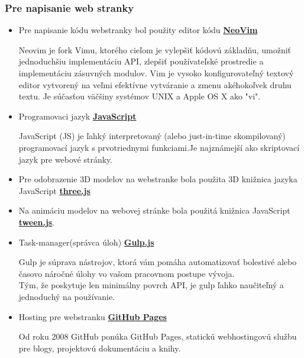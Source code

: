       \subsubsection{Pre napisanie web stranky}
        \begin{itemize}
          \item{
            Pre napisanie kódu webstranky bol použity editor kódu \textbf{\href{https://neovim.io/}{NeoVim}}

            Neovim je fork Vimu, ktorého cieľom je vylepšiť kódovú základňu, umožniť jednoduchšiu implementáciu API, zlepšiť používateľské prostredie a implementáciu zásuvných modulov.
            Vim je vysoko konfigurovateľný textový editor vytvorený na veľmi efektívne vytváranie a zmenu akéhokoľvek druhu textu. Je súčasťou väčšiny systémov UNIX a Apple OS X ako "vi".
          }
          \item{
            Programovaci jazyk \textbf{\href{https://developer.mozilla.org/en-US/docs/Web/JavaScript}{JavaScript}}

            JavaScript (JS) je ľahký interpretovaný (alebo just-in-time skompilovaný) programovací jazyk s prvotriednymi funkciami.Je najznámejší ako skriptovací jazyk pre webové stránky.
          }
          \item{
            Pre odobrazenie 3D modelov na webstranke bola použita 3D knižnica jazyka JavaScript \textbf{\href{https://github.com/mrdoob/three.js/}{three.js}}
          }
          \item{
            Na animáciu modelov na webovej stránke bola použitá knižnica JavaScript \textbf{\href{https://tweenjs.github.io/tween.js/}{tween.js}}.
          }
          \item{
            Task-manager(správca úloh) \textbf{\href{https://gulpjs.com}{Gulp.js}}

            Gulp je súprava nástrojov, ktorá vám pomáha automatizovať bolestivé alebo časovo náročné úlohy vo vašom pracovnom postupe vývoja. \\
            Tým, že poskytuje len minimálny povrch API, je gulp ľahko naučiteľný a jednoduchý na používanie.
          }
          \item{
            Hosting pre webstranku \textbf{\href{https://pages.github.com/}{GitHub Pages}} 

            Od roku 2008 GitHub ponúka GitHub Pages, statickú webhostingovú službu pre blogy, projektovú dokumentáciu a knihy.
          }
        \end{itemize}

